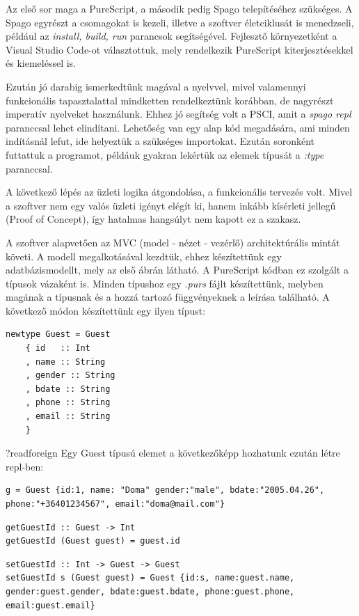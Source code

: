 \documentclass[12pt]{article}
\begin{document}
Az első sor maga a PureScript, a második pedig Spago telepítéséhez szükséges. A Spago egyrészt a csomagokat is kezeli, illetve a szoftver életciklusát is menedzseli, például az \textit{install, build, run} parancsok segítségével.  Fejlesztő környezetként a Visual Studio Code-ot választottuk, mely rendelkezik PureScript kiterjesztésekkel és kiemeléssel is.

Ezután jó darabig ismerkedtünk magával a nyelvvel, mivel valamennyi funkcionális tapasztalattal mindketten rendelkeztünk korábban, de nagyrészt imperatív nyelveket használunk.  Ehhez jó segítség volt a PSCI, amit a \textit{spago repl} paranccsal lehet elindítani. Lehetőség van egy alap kód megadására, ami minden indításnál lefut, ide helyeztük a szükséges importokat. Ezután soronként futtattuk a programot, példáuk gyakran lekértük az elemek típusát a \textit{:type} paranccsal.

A következő lépés az üzleti logika átgondolása, a funkcionális tervezés volt. Mivel a szoftver nem egy valós üzleti igényt elégít ki, hanem inkább kísérleti jellegű (Proof of Concept), így hatalmas hangsúlyt nem kapott ez a szakasz. 

A szoftver alapvetően az MVC (model - nézet - vezérlő) architektúrális mintát követi.  A modell megalkotásával kezdtük, ehhez készítettünk egy adatbázismodellt, mely az első ábrán látható. A PureScript kódban ez szolgált a típusok vázaként is. Minden típushoz egy \textit{.purs} fájlt készítettünk, melyben magának a típusnak és a hozzá tartozó függvényeknek a leírása található. A következő módon készítettünk egy ilyen típust:

\begin{verbatim}
newtype Guest = Guest
    { id   :: Int
    , name :: String
    , gender :: String
    , bdate :: String
    , phone :: String
    , email :: String
    }
\end{verbatim}
?readforeign
Egy Guest típusú elemet a következőképp hozhatunk ezután létre repl-ben:
\begin{verbatim}
g = Guest {id:1, name: "Doma" gender:"male", bdate:"2005.04.26", phone:"+36401234567", email:"doma@mail.com"}
\end{verbatim}

\begin{verbatim}
getGuestId :: Guest -> Int
getGuestId (Guest guest) = guest.id
\end{verbatim}

\begin{verbatim}
setGuestId :: Int -> Guest -> Guest
setGuestId s (Guest guest) = Guest {id:s, name:guest.name, gender:guest.gender, bdate:guest.bdate, phone:guest.phone, email:guest.email}

\end{verbatim}
\end{document}

